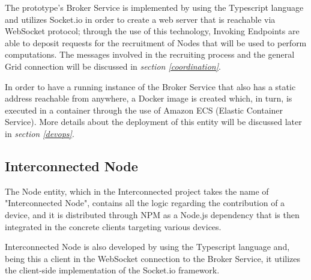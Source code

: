 The prototype's Broker Service is implemented by using the Typescript language and utilizes Socket.io in order to create a web server that is reachable via WebSocket protocol; through the use of this technology, Invoking Endpoints are able to deposit requests for the recruitment of Nodes that will be used to perform computations. The messages involved in the recruiting process and the general Grid connection will be discussed in \textit{section \ref{coordination}}.

In order to have a running instance of the Broker Service that also has a static address reachable from anywhere, a Docker image is created which, in turn, is executed in a container through the use of Amazon ECS (Elastic Container Service). More details about the deployment of this entity will be discussed later in \textit{section \ref{devops}}.

\subsection{Interconnected Node}
The Node entity, which in the Interconnected project takes the name of "Interconnected Node", contains all the logic regarding the contribution of a device, and it is distributed through NPM as a Node.js dependency that is then integrated in the concrete clients targeting various devices.

Interconnected Node is also developed by using the Typescript language and, being this a client in the WebSocket connection to the Broker Service, it utilizes the client-side implementation of the Socket.io framework.

